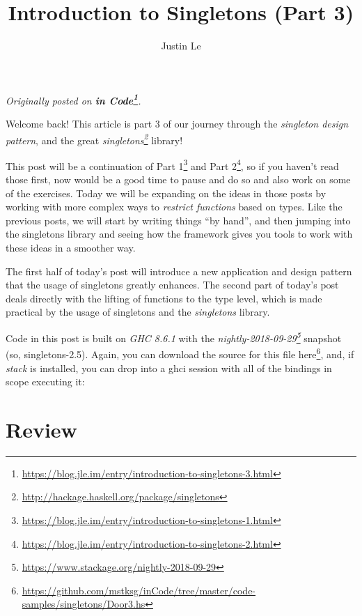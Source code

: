 \documentclass[]{article}
\title{Introduction to Singletons (Part 3)}
\author{Justin Le}
\newenvironment{Shaded}{}{}
\newcommand{\ExtensionTok}[1]{#1}
\newcommand{\NormalTok}[1]{#1}
\renewcommand{\href}[2]{#2\footnote{\url{#1}}}
\begin{document}
\maketitle

\emph{Originally posted on
\textbf{\href{https://blog.jle.im/entry/introduction-to-singletons-3.html}{in
Code}}.}

Welcome back! This article is part 3 of our journey through the \emph{singleton
design pattern}, and the great
\emph{\href{http://hackage.haskell.org/package/singletons}{singletons}} library!

This post will be a continuation of
\href{https://blog.jle.im/entry/introduction-to-singletons-1.html}{Part 1} and
\href{https://blog.jle.im/entry/introduction-to-singletons-2.html}{Part 2}, so
if you haven't read those first, now would be a good time to pause and do so and
also work on some of the exercises. Today we will be expanding on the ideas in
those posts by working with more complex ways to \emph{restrict functions} based
on types. Like the previous posts, we will start by writing things ``by hand'',
and then jumping into the singletons library and seeing how the framework gives
you tools to work with these ideas in a smoother way.

The first half of today's post will introduce a new application and design
pattern that the usage of singletons greatly enhances. The second part of
today's post deals directly with the lifting of functions to the type level,
which is made practical by the usage of singletons and the \emph{singletons}
library.

Code in this post is built on \emph{GHC 8.6.1} with the
\emph{\href{https://www.stackage.org/nightly-2018-09-29}{nightly-2018-09-29}}
snapshot (so, singletons-2.5). Again, you can download the source for this file
\href{https://github.com/mstksg/inCode/tree/master/code-samples/singletons/Door3.hs}{here},
and, if \emph{stack} is installed, you can drop into a ghci session with all of
the bindings in scope executing it:

\begin{Shaded}
\end{Shaded}

\hypertarget{review}{%
\section{Review}\label{review}}
\end{document}
